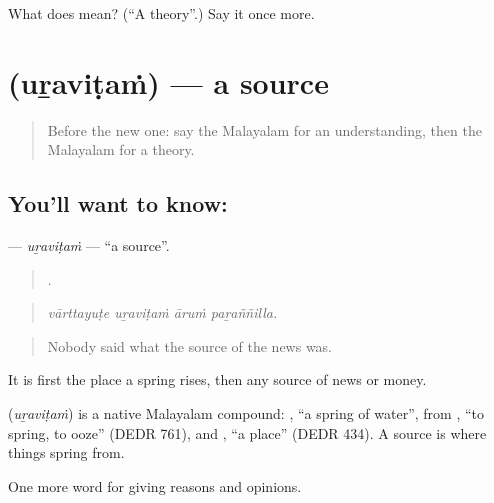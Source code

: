 \begin{tcolorbox}[breakable,colback=teal!4,colframe=teal!35!black,title={Before you move on}]
What does  mean? (\textquotedblleft{}A theory\textquotedblright{}.) Say it once more.
\end{tcolorbox}
\section[\texorpdfstring{\ml{ഉറവിടം} (uṟaviṭaṁ)}{ഉറവിടം (uṟaviṭaṁ)}]{ (uṟaviṭaṁ) — a source}

\label{lesson:ML-C414-uravitam}



\begin{quote}
Before the new one: say the Malayalam for an understanding, then the Malayalam for a theory.
\end{quote}

\subsection*{You'll want to know: }
\textbf{} — \emph{uṟaviṭaṁ} — \textquotedblleft{}a source\textquotedblright{}.

\begin{quote}
   .
\end{quote}

\begin{quote}
\emph{vārttayuṭe uṟaviṭaṁ āruṁ paṟaññilla.}
\end{quote}

\begin{quote}
Nobody said what the source of the news was.
\end{quote}

It is first the place a spring rises, then any source of news or money.

\begin{cousinweb}
\textbf{} (\emph{uṟaviṭaṁ}) is a native Malayalam compound: , \textquotedblleft{}a spring of water\textquotedblright{}, from , \textquotedblleft{}to spring, to ooze\textquotedblright{} (DEDR 761), and , \textquotedblleft{}a place\textquotedblright{} (DEDR 434). A source is where things spring from.
\end{cousinweb}

\begin{grammarlens}[title={What you've built}]
One more word for giving reasons and opinions.
\end{grammarlens}

